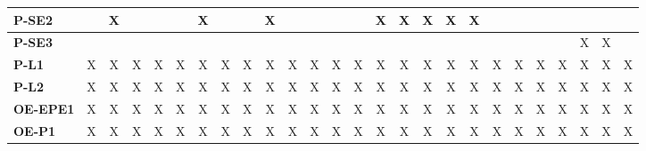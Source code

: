 \documentclass[12pt]{article}
\begin{document}
\begin{table}[H]
\begin{adjustwidth}{-1.4in}{-1in}
{\begin{tabular}{c|c|c|c|c|c|c|c|c|c|c|c|c|c|c|c|c|c|c|c|c|c|c|c|c|c|}
  \multicolumn{1}{|l|}{\textbf{P-SE2}}   &              &       X      &              &              &              &       X      &              &              &       X      &              &              &              &              &       X      &       X      &       X      &       X      &       X      &              &              &              &              &              &              &               \\ \hline
  \multicolumn{1}{|l|}{\textbf{P-SE3}}   &              &              &              &              &              &              &              &              &              &              &              &              &              &              &              &              &              &              &              &              &              &              &       X      &       X      &               \\ \hline
  \multicolumn{1}{|l|}{\textbf{P-L1}}    &       X      &       X      &       X      &       X      &       X      &       X      &       X      &       X      &       X      &       X      &       X      &       X      &       X      &       X      &       X      &       X      &       X      &       X      &       X      &       X      &       X      &       X      &       X      &       X      &       X       \\ \hline
  \multicolumn{1}{|l|}{\textbf{P-L2}}    &       X      &       X      &       X      &       X      &       X      &       X      &       X      &       X      &       X      &       X      &       X      &       X      &       X      &       X      &       X      &       X      &       X      &       X      &       X      &       X      &       X      &       X      &       X      &       X      &       X       \\ \hline
  \multicolumn{1}{|l|}{\textbf{OE-EPE1}} &       X      &       X      &       X      &       X      &       X      &       X      &       X      &       X      &       X      &       X      &       X      &       X      &       X      &       X      &       X      &       X      &       X      &       X      &       X      &       X      &       X      &       X      &       X      &       X      &       X       \\ \hline
  \multicolumn{1}{|l|}{\textbf{OE-P1}}   &       X      &       X      &       X      &       X      &       X      &       X      &       X      &       X      &       X      &       X      &       X      &       X      &       X      &       X      &       X      &       X      &       X      &       X      &       X      &       X      &       X      &       X      &       X      &       X      &       X       \\ \hline

\end{tabular}}
\end{adjustwidth}
\end{table}
\end{document}
